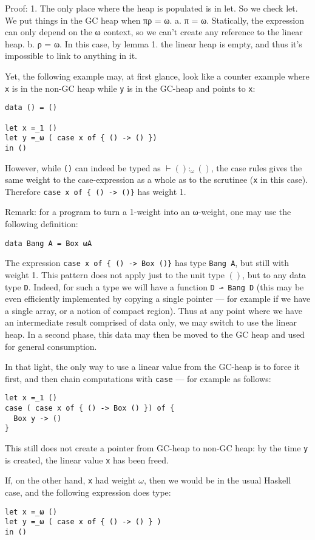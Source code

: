 \documentclass[11pt]{article}
\begin{document}
Proof:
1. The only place where the heap is populated is in let. So we check let. We put things in the GC heap when πρ = ω.
   a. π = ω. Statically, the expression can only depend on the ω context, so we can't create any reference to the linear heap.
   b. ρ = ω. In this case, by lemma 1. the linear heap is empty, and thus it's impossible to link to anything in it.



Yet, the following example may, at first glance, look like a counter
example where \verb|x| is in the non-GC heap while \verb|y| is in the
GC-heap and points to \verb|x|:
\begin{verbatim}
data () = ()

let x =_1 ()
let y =_ω ( case x of { () -> () })
in ()
\end{verbatim}
However, while \verb|()| can indeed be typed as $⊢ () :_ω ()$, the
case rules gives the same weight to the case-expression as a whole as to the
scrutinee (\verb|x| in this case). Therefore
\verb|case x of { () -> ()}| has weight 1.

Remark: for a program to turn a 1-weight into an ω-weight, one may use
the following definition:
\begin{verbatim}
data Bang A = Box ωA
\end{verbatim}
The expression \verb|case x of { () -> Box ()}| has type
\verb|Bang A|, but still with weight 1.  This pattern does not apply
just to the unit type $()$, but to any data type \verb|D|. Indeed, for such
a type we will have a function \verb|D ⊸ Bang D| (this may be even
efficiently implemented by copying a single pointer --- for example if
we have a single array, or a notion of compact region).  Thus at any
point where we have an intermediate result comprised of data only, we
may switch to use the linear heap. In a second phase, this data may
then be moved to the GC heap and used for general consumption.

In that light, the only way to use a linear value from the GC-heap is
to force it first, and then chain computations with \verb|case| --- for
example as follows:
\begin{verbatim}
let x =_1 ()
case ( case x of { () -> Box () }) of {
  Box y -> ()
}
\end{verbatim}
This still does not create a pointer from GC-heap to non-GC heap: by the
time \verb|y| is created, the linear value \verb|x| has been freed.

If, on the other hand, \verb|x| had weight $ω$, then we would be in the
usual Haskell case, and the following expression does type:
\begin{verbatim}
let x =_ω ()
let y =_ω ( case x of { () -> () } )
in ()
\end{verbatim}
\end{document}
